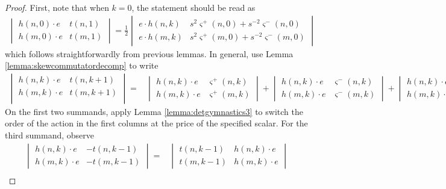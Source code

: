 \begin{proof}
First, note that when $k=0$, the statement should be read as
\begin{align*}
\begin{vmatrix}
h(n, 0) \cdot e & t(n, 1) \\
h(m, 0) \cdot e & t(m, 1)
\end{vmatrix} 
=
\frac{1}{2}
\begin{vmatrix}
e \cdot h(n, k) & s^2 \varsigma^+ (n, 0) + s^{-2} \varsigma^- (n, 0)\\
e \cdot h(m, k) & s^2 \varsigma^+ (m, 0) + s^{-2} \varsigma^- (m, 0)
\end{vmatrix}
\end{align*}
which follows straightforwardly from previous lemmas. In general, use Lemma \ref{lemma:skewcommutatordecomp} to write 
\begin{align*}
\begin{vmatrix}
h(n, k) \cdot e & t(n, k+1) \\
h(m, k) \cdot e & t(m, k+1) \\
\end{vmatrix}
=&
\begin{vmatrix}
h(n, k) \cdot e & \varsigma^+ (n, k) \\
h(m, k) \cdot e & \varsigma^+ (m, k)
\end{vmatrix}
+
\begin{vmatrix}
h(n, k) \cdot e & \varsigma^- (n, k) \\
h(m, k) \cdot e & \varsigma^- (m, k) 
\end{vmatrix}
+
\begin{vmatrix}
h(n, k) \cdot e & - t(n, k-1)\\
h(m, k) \cdot e & - t(m, k-1)
\end{vmatrix}.
\end{align*}
On the first two summands, apply Lemma \ref{lemma:detgymnastics3} to switch the order of the action in the first columns at the price of the specified scalar. For the third summand, observe
\begin{align*}
\begin{vmatrix}
h(n, k) \cdot e & - t(n, k-1) \\
h(m, k) \cdot e & - t(m, k-1) 
\end{vmatrix}
=&
\begin{vmatrix}
t(n, k-1) & h(n, k) \cdot e \\
t(m, k-1) & h(m, k) \cdot e
\end{vmatrix} \\

\end{align*}
\end{proof}
